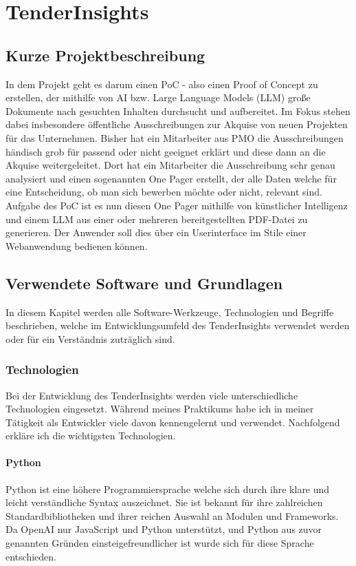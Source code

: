 \chapter{TenderInsights}

\section{Kurze Projektbeschreibung}
In dem Projekt geht es darum einen PoC - also einen Proof of Concept zu erstellen, der mithilfe von AI bzw. Large Language 
Models (LLM) große Dokumente nach gesuchten Inhalten durchsucht und aufbereitet. Im Fokus stehen dabei insbesondere 
öffentliche Ausschreibungen zur Akquise von neuen Projekten für das Unternehmen. Bisher hat ein Mitarbeiter aus PMO die 
Ausschreibungen händisch grob für passend oder nicht geeignet erklärt und diese dann an die Akquise weitergeleitet. 
Dort hat ein Mitarbeiter die Ausschreibung sehr genau analysiert und einen sogenannten One Pager erstellt, der alle 
Daten welche für eine Entscheidung, ob man sich bewerben möchte oder nicht, relevant sind. Aufgabe des PoC ist es nun 
diesen One Pager mithilfe von künstlicher Intelligenz und einem LLM aus einer oder mehreren bereitgestellten PDF-Datei zu 
generieren. Der Anwender soll dies über ein Userinterface im Stile einer Webanwendung bedienen können.

\section{Verwendete Software und Grundlagen}
In diesem Kapitel werden alle Software-Werkzeuge, Technologien und Begriffe beschrieben, welche im Entwicklungsumfeld des 
TenderInsights verwendet werden oder für ein Verständnis zuträglich sind.


\subsection{Technologien}
Bei der Entwicklung des TenderInsights werden viele unterschiedliche Technologien eingesetzt. Während meines Praktikums habe ich 
in meiner Tätigkeit als Entwickler viele davon kennengelernt und verwendet. Nachfolgend erkläre ich die wichtigsten Technologien.

\subsubsection{Python}
Python ist eine höhere Programmiersprache welche sich durch ihre klare und leicht verständliche Syntax auszeichnet.
Sie ist bekannt für ihre zahlreichen Standardbibliotheken und ihrer reichen Auswahl an Modulen und Frameworks.
Da OpenAI nur JavaScript und Python unterstützt, und Python aus zuvor genannten Gründen einsteigefreundlicher ist wurde sich 
für diese Sprache entschieden.

